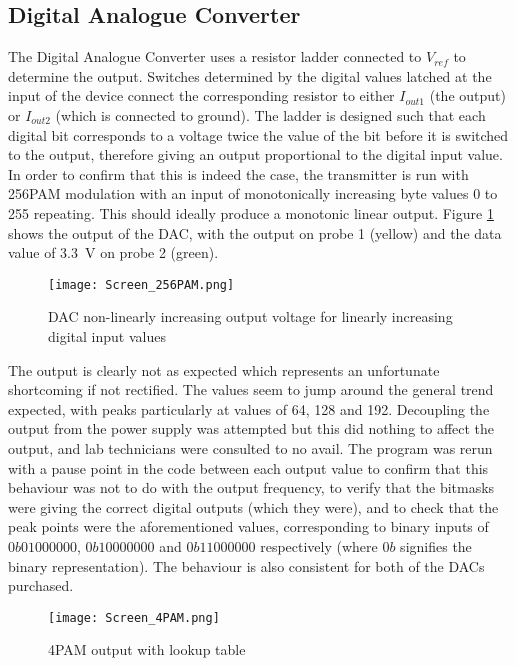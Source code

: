 \documentclass[../main.tex]{subfiles}
\begin{document}
\subsection{Digital Analogue Converter} \label{sec_Characterising DAC}

The Digital Analogue Converter uses a resistor ladder connected to $V_{ref}$ to determine the output.
Switches determined by the digital values latched at the input of the device connect the corresponding resistor to either $I_{out1}$ (the output) or $I_{out2}$ (which is connected to ground).
The ladder is designed such that each digital bit corresponds to a voltage twice the value of the bit before it is switched to the output, therefore giving an output proportional to the digital input value.
In order to confirm that this is indeed the case, the transmitter is run with 256PAM modulation with an input of monotonically increasing byte values 0 to 255 repeating.
This should ideally produce a monotonic linear output.
Figure \ref{fig_DAC Non-continuous} shows the output of the DAC, with the output on probe 1 (yellow) and the data value of \SI{3.3}{\volt} on probe 2 (green).\\

\begin{figure}[ht]
	\centering
	\texttt{[image: Screen\_256PAM.png]}
	\caption{DAC non-linearly increasing output voltage for linearly increasing digital input values}
	\label{fig_DAC Non-continuous}
\end{figure}

The output is clearly not as expected which represents an unfortunate shortcoming if not rectified.
The values seem to jump around the general trend expected, with peaks particularly at values of 64, 128 and 192.
Decoupling the output from the power supply was attempted but this did nothing to affect the output, and lab technicians were consulted to no avail.
The program was rerun with a pause point in the code between each output value to confirm that this behaviour was not to do with the output frequency, to verify that the bitmasks were giving the correct digital outputs (which they were), and to check that the peak points were the aforementioned values, corresponding to binary inputs of $0b01000000$, $0b10000000$ and $0b11000000$ respectively (where $0b$ signifies the binary representation).
The behaviour is also consistent for both of the DACs purchased.\\

\begin{figure}[ht]
	\centering
	\texttt{[image: Screen\_4PAM.png]}
	\caption{4PAM output with lookup table}
	\label{fig_4PAM Lookup}
\end{figure}
\end{document}
